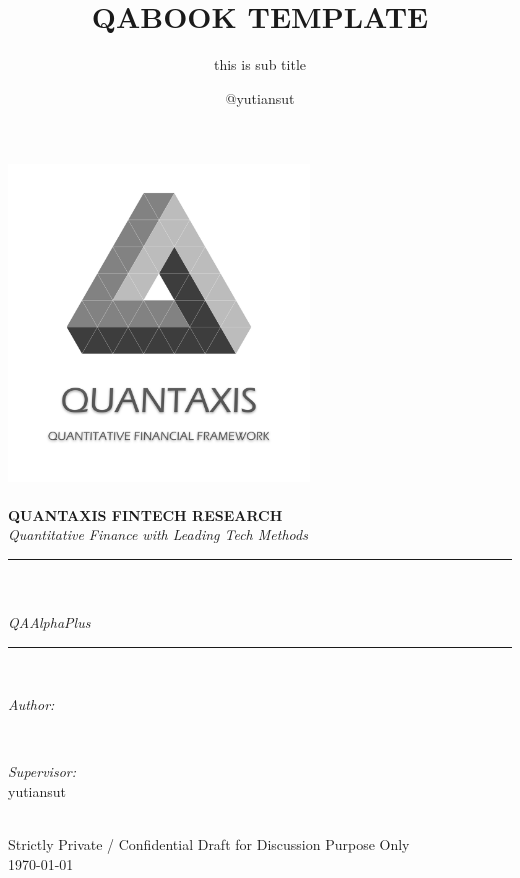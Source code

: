 \documentclass{scrartcl}
\numberwithin{equation}{section}
\begin{document}
\title{QABOOK TEMPLATE}%
\subtitle{this is sub title}
\author{@yutiansut}
\begin{titlepage}
    \newcommand{\HRule}{\rule{\linewidth}{0.5mm}}
    \includegraphics[width=8cm]{title/qalogo.png}\\[1cm]
    \center
    \quad\\[1.5cm]
    \textbf{\Large  QUANTAXIS FINTECH RESEARCH }\\[0.5cm]
    \textsl{\large Quantitative Finance with Leading Tech Methods}\\[0.5cm]

    \makeatletter
    \HRule \\[0.4cm]
    { \huge \bfseries \@title}\\[0.4cm]
    \textsl{\large QAAlphaPlus}\\[0.5cm]
    \HRule \\[1.5cm]
    \begin{minipage}{0.4\textwidth}
        \begin{flushleft} \large
            \emph{Author:}\\
            \@author
        \end{flushleft}
    \end{minipage}
    ~
    \begin{minipage}{0.4\textwidth}
        \begin{flushright} \large
            \emph{Supervisor:} \\
            \textup{yutiansut}
        \end{flushright}
    \end{minipage}\\[2cm]
    \makeatother
    {\large Strictly Private / Confidential Draft for Discussion Purpose Only}\\[0.5cm]
    {\large \today}\\[1cm]
    \vfill
\end{titlepage}
\end{document}
